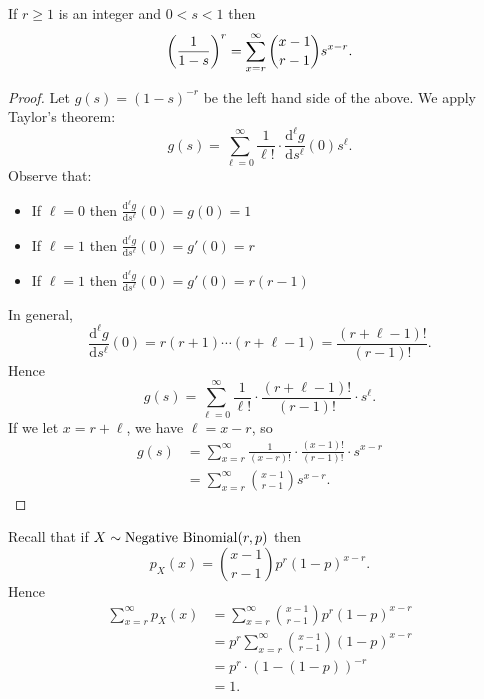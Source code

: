 \documentclass[class=article, crop=false]{standalone}
\begin{document}
  \begin{theorem}{}
    If $r \geq 1$ is an integer and $0 < s < 1$ then
    \[
      \left( \frac{1}{1 - s} \right)^r = \sum_{x=r}^{\infty}\binom{x - 1}{r - 1}s^{x - r}.
    \]
    \begin{proof}
      Let $g(s) = (1 - s)^{-r}$ be the left hand side of the above. We apply Taylor's theorem:
      \[
        g(s) = \sum_{\ell=0}^{\infty} \frac{1}{\ell!}\cdot \frac{\mathrm{d}^\ell g}{\mathrm{d}s^\ell}(0)s^\ell.
      \]
      Observe that:
      \begin{itemize}
        \item If $\ell = 0$ then $\frac{\mathrm{d}^\ell g}{\mathrm{d}s^\ell}(0) = g(0) = 1$
        \item If $\ell = 1$ then $\frac{\mathrm{d}^\ell g}{\mathrm{d}s^\ell}(0) = g'(0) = r$
        \item If $\ell = 1$ then $\frac{\mathrm{d}^\ell g}{\mathrm{d}s^\ell}(0) = g'(0) = r(r - 1)$
      \end{itemize}
      In general,
      \[
        \frac{\mathrm{d}^\ell g}{\mathrm{d}s^\ell}(0) = r(r + 1)\dotsb(r + \ell - 1) = \frac{(r + \ell - 1)!}{(r - 1)!}.
      \]
      Hence
      \[
        g(s) = \sum_{\ell=0}^{\infty} \frac{1}{\ell!}\cdot \frac{(r + \ell - 1)!}{(r - 1)!}\cdot s^\ell.
      \]
      If we let $x = r + \ell$, we have $\ell = x - r$, so
      \begin{align*}
        g(s) &= \sum_{x=r}^{\infty} \frac{1}{(x - r)!}\cdot \frac{(x - 1)!}{(r - 1)!}\cdot s^{x - r} \\
             &= \sum_{x=r}^{\infty} \binom{x - 1}{r - 1}s^{x - r}.
      \end{align*}
    \end{proof}
  \end{theorem}
  \begin{note}{}
    Recall that if $X\sim \operatorname{Negative\ Binomial}(r, p)$ then
    \[
      p_X(x) = \binom{x - 1}{r - 1} p^r(1 - p)^{x - r}.
    \]
    Hence
    \begin{align*}
      \sum_{x=r}^{\infty} p_X(x) &= \sum_{x=r}^{\infty} \binom{x - 1}{r - 1} p^r(1 - p)^{x - r} \\
                                 &= p^r \sum_{x=r}^{\infty} \binom{x - 1}{r - 1} (1 - p)^{x - r} \\
                                 &= p^r\cdot (1 - (1 - p))^{-r} \\
                                 &= 1.
    \end{align*}
  \end{note}
\end{document}
